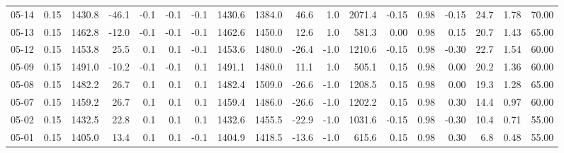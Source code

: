 \begin{threeparttable}
{\begin{tabular}{lrrrrrrrrrrrrrrrrr}
  05-14 &     0.15 & 1430.8 &             -46.1 &              -0.1 &               -0.1 &               -0.1 & 1430.6 & 1384.0 &       46.6 &                      1.0 &              2071.4 &      -0.15 &      0.98 &          -0.15 &             24.7 &            1.78 &                  70.00 \\
  05-13 &     0.15 & 1462.8 &             -12.0 &              -0.1 &               -0.1 &               -0.1 & 1462.6 & 1450.0 &       12.6 &                      1.0 &               581.3 &       0.00 &      0.98 &           0.15 &             20.7 &            1.43 &                  65.00 \\
  05-12 &     0.15 & 1453.8 &              25.5 &               0.1 &                0.1 &               -0.1 & 1453.6 & 1480.0 &      -26.4 &                     -1.0 &              1210.6 &      -0.15 &      0.98 &          -0.30 &             22.7 &            1.54 &                  60.00 \\
  05-09 &     0.15 & 1491.0 &             -10.2 &              -0.1 &               -0.1 &                0.1 & 1491.1 & 1480.0 &       11.1 &                      1.0 &               505.1 &       0.15 &      0.98 &           0.00 &             20.2 &            1.36 &                  60.00 \\
  05-08 &     0.15 & 1482.2 &              26.7 &               0.1 &                0.1 &                0.1 & 1482.4 & 1509.0 &      -26.6 &                     -1.0 &              1208.5 &       0.15 &      0.98 &           0.00 &             19.3 &            1.28 &                  65.00 \\
  05-07 &     0.15 & 1459.2 &              26.7 &               0.1 &                0.1 &                0.1 & 1459.4 & 1486.0 &      -26.6 &                     -1.0 &              1202.2 &       0.15 &      0.98 &           0.30 &             14.4 &            0.97 &                  60.00 \\
  05-02 &     0.15 & 1432.5 &              22.8 &               0.1 &                0.1 &                0.1 & 1432.6 & 1455.5 &      -22.9 &                     -1.0 &              1031.6 &      -0.15 &      0.98 &          -0.30 &             10.4 &            0.71 &                  55.00 \\
  05-01 &     0.15 & 1405.0 &              13.4 &               0.1 &                0.1 &               -0.1 & 1404.9 & 1418.5 &      -13.6 &                     -1.0 &               615.6 &       0.15 &      0.98 &           0.30 &              6.8 &            0.48 &                  55.00 \\

\end{tabular}}
\end{threeparttable}
